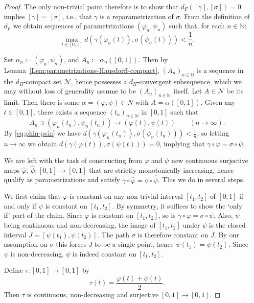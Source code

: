 \documentclass[a4paper,11pt]{article}
\numberwithin{equation}{section}
\theoremstyle{plain}
\theoremstyle{definition}
\newcommand{\N}{\mathbb N}
\begin{document}
\begin{appendices}
\begin{proof}
The only non-trivial point therefore is to show that $d_F([\gamma],[\sigma])=0$ implies $[\gamma]=[\sigma]$, i.e., that $\gamma$ is a reparametrization of $\sigma$. From the definition of $d_F$ we obtain sequences of parametrizations $(\varphi_n,\psi_n)$ such that, for each $n\in\N$:
\begin{equation}\label{eq:phin-psin}
    \max_{t\in [0,1]} d(\gamma(\varphi_n(t)),\sigma(\psi_n(t))) < \frac{1}{n}.
\end{equation}

Set $\alpha_n \coloneqq (\varphi_n,\psi_n)$, and $A_n \coloneqq \alpha_n([0,1])$. Then by Lemma~\ref{Lem:parametrizations-Hausdorff-compact}, $(A_n)_{n\in \N}$
is a sequence in the $d_H$-compact set $\mathcal{N}$, hence possesses a $d_H$-convergent subsequence, which we may without loss of generality assume to be $(A_n)_{n\in \N}$ itself. Let $A\in \mathcal{N}$ be its limit. Then there is some $\alpha = (\varphi,\psi)\in N$ with $A=\alpha([0,1])$. Given any $t\in [0,1]$, there exists a sequence $(t_n)_{n\in \N}$ in $[0,1]$ such that 
\[
A_n\ni (\varphi_n(t_n),\psi_n(t_n)) \to (\varphi(t),\psi(t)) \qquad (n\to \infty).
\]
By \eqref{eq:phin-psin} we have $d(\gamma(\varphi_n(t_n)),\sigma(\psi_n(t_n))) < \frac{1}{n}$, so letting $n\to \infty$ we obtain
$d(\gamma(\varphi(t)),\sigma(\psi(t)))=0$, implying that $\gamma\circ \varphi = \sigma\circ \psi$. 

We are left with the task of constructing from $\varphi$ and $\psi$ new continuous surjective maps $\hat\varphi$, $\hat\psi \colon [0,1]\to [0,1]$ that are strictly monotonically increasing, hence qualify as parametrizations and satisfy $\gamma\circ \hat\varphi = \sigma\circ \hat\psi$. This we do
in several steps.

We first claim that $\varphi$ is constant on any non-trivial interval $[t_1,t_2]$ of $[0,1]$ if and only if $\psi$ is constant on $[t_1,t_2]$.
By symmetry, it suffices to show the `only if' part of the claim. Since $\varphi$ is constant on $[t_1,t_2]$, so is
$\gamma\circ \varphi = \sigma\circ \psi$.
Also, $\psi$ being continuous and non-decreasing, the image of $[t_1, t_2]$ under $\psi$ is the closed interval $J = [\psi(t_1), \psi(t_2)]$.
The path $\sigma$ is therefore constant on $J$. By our assumption on $\sigma$ this forces $J$ to be a single point, hence
$\psi(t_1) = \psi(t_2)$. Since $\psi$ is non-decreasing, $\psi$ is indeed constant on $[t_1, t_2]$.

Define $\tau \colon [0,1] \to [0,1]$ by
$$
\tau(t) = \frac{\varphi(t) + \psi(t)}{2}.
$$
Then $\tau$ is continuous, non-decreasing and surjective $[0,1]\to [0,1]$. 


\end{proof}
\end{appendices}
\end{document}
